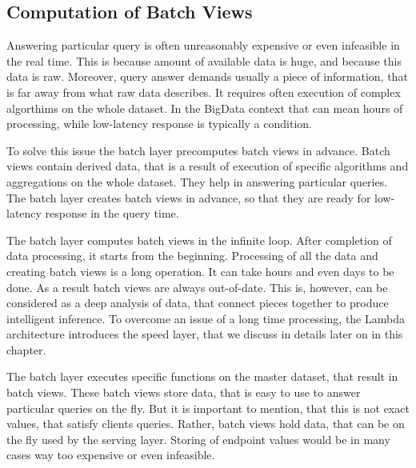 \subsection{Computation of Batch Views}

Answering particular query is often unreasonably expensive or even infeasible in the real time.
This is because amount of available data is huge, and because this data is raw. 
Moreover, query answer demands usually a piece of information, that is far away from what raw data describes.
It requires often execution of complex algorthims on the whole dataset.
In the BigData context that can mean hours of processing, while low-latency response is typically a condition.

To solve this issue the batch layer precomputes batch views in advance.
Batch views contain derived data, that is a result of execution of specific algorithms and aggregations on the whole dataset.
They help in answering particular queries.
The batch layer creates batch views in advance, so that they are ready for low-latency response in the query time.

The batch layer computes batch views in the infinite loop.
After completion of data processing, it starts from the beginning.
Processing of all the data and creating batch views is a long operation.
It can take hours and even days to be done.
As a result batch views are always out-of-date.
This is, however, can be considered as a deep analysis of data, that connect pieces together to produce intelligent inference.
To overcome an issue of a long time processing, the Lambda architecture introduces the speed layer, that we discuss in details later on in this chapter.

The batch layer executes specific functions on the master dataset, that result in batch views.
These batch views store data, that is easy to use to answer particular queries on the fly.
But it is important to mention, that this is not exact values, that satisfy clients queries.
Rather, batch views hold data, that can be on the fly used by the serving layer.
Storing of endpoint values would be in many cases way too expensive or even infeasible.

